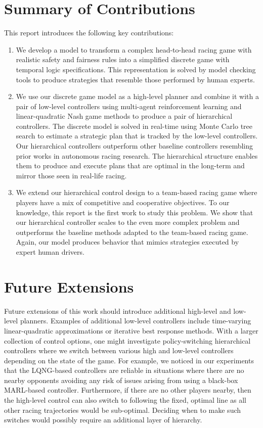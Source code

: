 \section{Summary of Contributions}
This report introduces the following key contributions:
\begin{enumerate}
    \item We develop a model to transform a complex head-to-head racing game with realistic safety and fairness rules into a simplified discrete game with temporal logic specifications. This representation is solved by model checking tools to produce strategies that resemble those performed by human experts.
    
    \item We use our discrete game model as a high-level planner and combine it with a pair of low-level controllers using multi-agent reinforcement learning and linear-quadratic Nash game methods to produce a pair of hierarchical controllers. The discrete model is solved in real-time using Monte Carlo tree search to estimate a strategic plan that is tracked by the low-level controllers. Our hierarchical controllers outperform other baseline controllers resembling prior works in autonomous racing research. The hierarchical structure enables them to produce and execute plans that are optimal in the long-term and mirror those seen in real-life racing.
    
    \item We extend our hierarchical control design to a team-based racing game where players have a mix of competitive and cooperative objectives. To our knowledge, this report is the first work to study this problem. We show that our hierarchical controller scales to the even more complex problem and outperforms the baseline methods adapted to the team-based racing game. Again, our model produces behavior that mimics strategies executed by expert human drivers.
\end{enumerate}
\section{Future Extensions}
Future extensions of this work should introduce additional high-level and low-level planners. Examples of additional low-level controllers include time-varying linear-quadratic approximations or iterative best response methods. With a larger collection of control options, one might investigate policy-switching hierarchical controllers where we switch between various high and low-level controllers depending on the state of the game. For example, we noticed in our experiments that the LQNG-based controllers are reliable in situations where there are no nearby opponents avoiding any risk of issues arising from using a black-box MARL-based controller. Furthermore, if there are no other players nearby, then the high-level control can also switch to following the fixed, optimal line as all other racing trajectories would be sub-optimal. Deciding when to make such switches would possibly require an additional layer of hierarchy.

